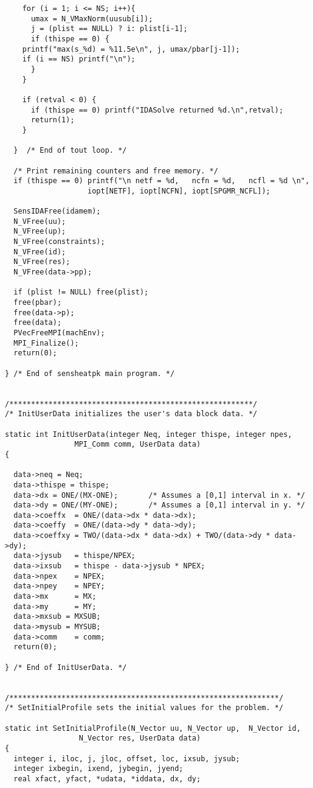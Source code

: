 \begin{verbatim}
    for (i = 1; i <= NS; i++){
      umax = N_VMaxNorm(uusub[i]);
      j = (plist == NULL) ? i: plist[i-1];
      if (thispe == 0) {
	printf("max(s_%d) = %11.5e\n", j, umax/pbar[j-1]);
	if (i == NS) printf("\n");
      }
    }

    if (retval < 0) {
      if (thispe == 0) printf("IDASolve returned %d.\n",retval);
      return(1);
    }

  }  /* End of tout loop. */

  /* Print remaining counters and free memory. */
  if (thispe == 0) printf("\n netf = %d,   ncfn = %d,   ncfl = %d \n", 
                   iopt[NETF], iopt[NCFN], iopt[SPGMR_NCFL]);

  SensIDAFree(idamem);
  N_VFree(uu);
  N_VFree(up);
  N_VFree(constraints);
  N_VFree(id);
  N_VFree(res);
  N_VFree(data->pp);

  if (plist != NULL) free(plist);
  free(pbar);
  free(data->p);
  free(data);
  PVecFreeMPI(machEnv);
  MPI_Finalize();
  return(0);

} /* End of sensheatpk main program. */


/********************************************************/
/* InitUserData initializes the user's data block data. */

static int InitUserData(integer Neq, integer thispe, integer npes,
		        MPI_Comm comm, UserData data)
{

  data->neq = Neq;
  data->thispe = thispe;
  data->dx = ONE/(MX-ONE);       /* Assumes a [0,1] interval in x. */
  data->dy = ONE/(MY-ONE);       /* Assumes a [0,1] interval in y. */
  data->coeffx  = ONE/(data->dx * data->dx);
  data->coeffy  = ONE/(data->dy * data->dy);
  data->coeffxy = TWO/(data->dx * data->dx) + TWO/(data->dy * data->dy);
  data->jysub   = thispe/NPEX;
  data->ixsub   = thispe - data->jysub * NPEX;
  data->npex    = NPEX;
  data->npey    = NPEY;
  data->mx      = MX;
  data->my      = MY;
  data->mxsub = MXSUB;
  data->mysub = MYSUB;
  data->comm    = comm;
  return(0);

} /* End of InitUserData. */


/**************************************************************/
/* SetInitialProfile sets the initial values for the problem. */

static int SetInitialProfile(N_Vector uu, N_Vector up,  N_Vector id, 
			     N_Vector res, UserData data)
{
  integer i, iloc, j, jloc, offset, loc, ixsub, jysub;
  integer ixbegin, ixend, jybegin, jyend;
  real xfact, yfact, *udata, *iddata, dx, dy;


\end{verbatim}
